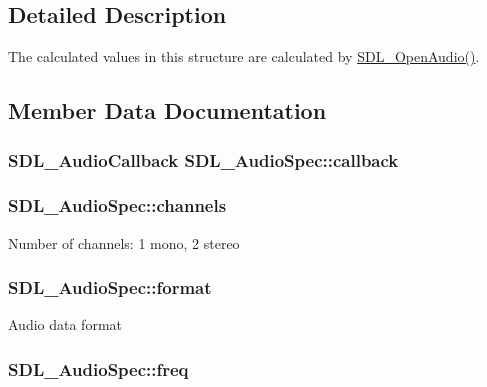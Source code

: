 \subsection{Detailed Description}
The calculated values in this structure are calculated by \hyperlink{_s_d_l__audio_8h_a2edf30e7747584e28041b4986f89f440}{S\-D\-L\-\_\-\-Open\-Audio()}. 

\subsection{Member Data Documentation}
\hypertarget{struct_s_d_l___audio_spec_a1f8d05139f1679dcf359f49251233eac}{
\subsubsection[{callback}]{\setlength{\rightskip}{0pt plus 5cm}S\-D\-L\-\_\-\-Audio\-Callback S\-D\-L\-\_\-\-Audio\-Spec\-::callback}}\label{struct_s_d_l___audio_spec_a1f8d05139f1679dcf359f49251233eac}
\hypertarget{struct_s_d_l___audio_spec_a31fe8b3710cf23bbef24be8a1749fe46}{
\subsubsection[{channels}]{ S\-D\-L\-\_\-\-Audio\-Spec\-::channels}}\label{struct_s_d_l___audio_spec_a31fe8b3710cf23bbef24be8a1749fe46}
Number of channels\-: 1 mono, 2 stereo \hypertarget{struct_s_d_l___audio_spec_ae37c634cac5807762f184c8d5d49fc2d}{
\subsubsection[{format}]{ S\-D\-L\-\_\-\-Audio\-Spec\-::format}}\label{struct_s_d_l___audio_spec_ae37c634cac5807762f184c8d5d49fc2d}
Audio data format \hypertarget{struct_s_d_l___audio_spec_a8b823ce46fc2e448cf7e6fc141aff6b2}{
\subsubsection[{freq}]{ S\-D\-L\-\_\-\-Audio\-Spec\-::freq}}\label{struct_s_d_l___audio_spec_a8b823ce46fc2e448cf7e6fc141aff6b2}
